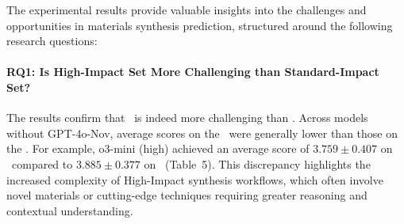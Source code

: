 

The experimental results provide valuable insights into the challenges and opportunities in materials synthesis prediction, structured around the following research questions:


\paragraph*{RQ1: Is High-Impact Set More Challenging than Standard-Impact Set?}
The results confirm that \testhi~is indeed more challenging than \testsi. Across models without GPT-4o-Nov, average scores on the \testhi~were generally lower than those on the \testsi. For example, o3-mini (high) achieved an average score of \(3.759 \pm 0.407\) on \testhi~compared to \(3.885 \pm 0.377\) on \testsi~(Table~5). This discrepancy highlights the increased complexity of High-Impact synthesis workflows, which often involve novel materials or cutting-edge techniques requiring greater reasoning and contextual understanding.




